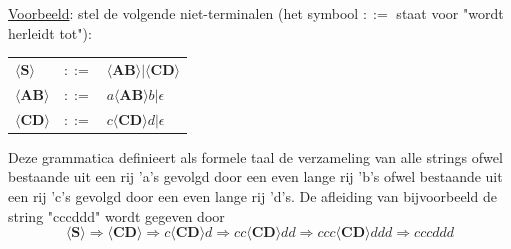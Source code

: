 \documentclass{report}
\begin{document}
\underline{Voorbeeld}: stel de volgende niet-terminalen (het symbool $::=$ staat voor "wordt herleidt tot"):
\begin{table}[ht]
	\centering
	\begin{tabular}{l l l}
		$\langle \textbf{S} \rangle$ & $::=$ & $\langle \textbf{AB} \rangle | \langle \textbf{CD} \rangle$ \\
		$\langle \textbf{AB} \rangle$ & $::=$ & $a\langle \textbf{AB} \rangle b | \epsilon$ \\
		$\langle \textbf{CD} \rangle$ & $::=$ & $c\langle \textbf{CD} \rangle d | \epsilon$ \\
	\end{tabular}
\end{table}
Deze grammatica definieert als formele taal de verzameling van alle strings ofwel bestaande uit een rij 'a's gevolgd door een even lange rij 'b's ofwel bestaande uit een rij 'c's gevolgd door een even lange rij 'd's. De afleiding van bijvoorbeeld de string "cccddd" wordt gegeven door
$$\langle \textbf{S} \rangle \Rightarrow  \langle \textbf{CD} \rangle  \Rightarrow  c\langle \textbf{CD} \rangle d
\Rightarrow  cc\langle \textbf{CD} \rangle dd \Rightarrow  ccc\langle \textbf{CD} \rangle ddd \Rightarrow  cccddd$$
\end{document}
